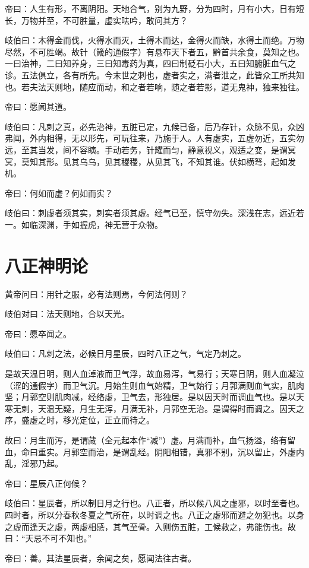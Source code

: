 \documentclass{article}%
\begin{document}
帝曰：人生有形，不离阴阳。天地合气，别为九野，分为四时，月有小大，日有短长，万物并至，不可胜量，虚实呿吟，敢问其方？

岐伯曰：木得金而伐，火得水而灭，土得木而达，金得火而缺，水得土而绝。万物尽然，不可胜竭。故针（箴的通假字）有悬布天下者五，黔首共余食，莫知之也。一曰治神，二曰知养身，三曰知毒药为真，四曰制砭石小大，五曰知腑脏血气之诊。五法俱立，各有所先。今末世之刺也，虚者实之，满者泄之，此皆众工所共知也。若夫法天则地，随应而动，和之者若响，随之者若影，道无鬼神，独来独往。

帝曰：愿闻其道。

岐伯曰：凡刺之真，必先治神，五脏已定，九候已备，后乃存针，众脉不见，众凶弗闻，外内相得，无以形先，可玩往来，乃施于人。人有虚实，五虚勿近，五实勿远，至其当发，间不容瞚。手动若务，针耀而匀，静意视义，观适之变，是谓冥冥，莫知其形。见其乌乌，见其稷稷，从见其飞，不知其谁。伏如横弩，起如发机。

帝曰：何如而虚？何如而实？

岐伯曰：刺虚者须其实，刺实者须其虚。经气已至，慎守勿失。深浅在志，远近若一。如临深渊，手如握虎，神无营于众物。
\section{八正神明论}
黄帝问曰：用针之服，必有法则焉，今何法何则？

岐伯对曰：法天则地，合以天光。

帝曰：愿卒闻之。

岐伯曰：凡刺之法，必候日月星辰，四时八正之气，气定乃刺之。

是故天温日明，则人血淖液而卫气浮，故血易泻，气易行；天寒日阴，则人血凝泣（涩的通假字）而卫气沉。月始生则血气始精，卫气始行；月郭满则血气实，肌肉坚；月郭空则肌肉减，经络虚，卫气去，形独居。是以因天时而调血气也。是以天寒无刺，天温无疑，月生无泻，月满无补，月郭空无治。是谓得时而调之。因天之序，盛虚之时，移光定位，正立而待之。

故曰：月生而泻，是谓藏（全元起本作“减”）虚。月满而补，血气扬溢，络有留血，命曰重实。月郭空而治，是谓乱经。阴阳相错，真邪不别，沉以留止，外虚内乱，淫邪乃起。

帝曰：星辰八正何候？

岐伯曰：星辰者，所以制日月之行也。八正者，所以候八风之虚邪，以时至者也。四时者，所以分春秋冬夏之气所在，以时调之也。八正之虚邪而避之勿犯也。以身之虚而逢天之虚，两虚相感，其气至骨。入则伤五脏，工候救之，弗能伤也。故曰：“天忌不可不知也。”

帝曰：善。其法星辰者，余闻之矣，愿闻法往古者。
\end{document}
